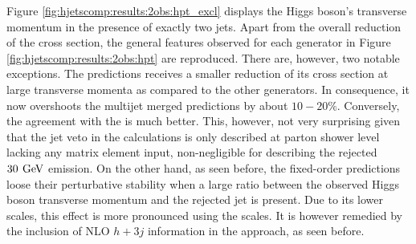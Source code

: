 Figure \ref{fig:hjetscomp:results:2obs:hpt_excl} displays the 
Higgs boson's transverse momentum in the presence of exactly two jets. 
Apart from the overall reduction of the cross section, the general 
features observed for each generator in Figure 
\ref{fig:hjetscomp:results:2obs:hpt} are reproduced. There are, 
however, two notable exceptions. The \Powheg \NNLOPS predictions 
receives a smaller reduction of its cross section at large transverse 
momenta as compared to the other generators. In consequence, it now 
overshoots the multijet merged predictions by about $10-20\%$. Conversely, 
the agreement with the \Sherpa \NNLOPS is much better. This, however, 
not very surprising given that the jet veto in the \NNLOPS calculations 
is only described at parton shower level lacking any matrix element 
input, non-negligible for describing the rejected $30\,\text{\:GeV}$ emission. 
On the other hand, as seen before, the fixed-order predictions loose 
their perturbative stability when a large ratio between the observed 
Higgs boson transverse momentum and the rejected jet is present. Due to 
its lower scales, this effect is more pronounced using the \Minlo scales. 
It is however remedied by the inclusion of NLO $h+3j$ information in the 
\Loopsim approach, as seen before.

